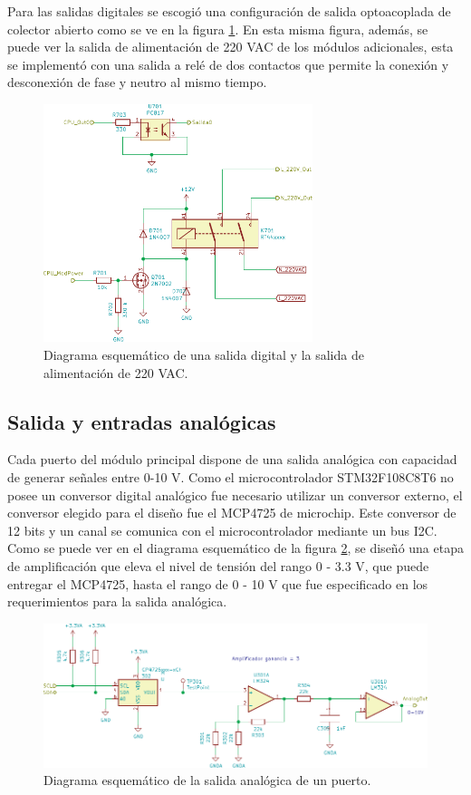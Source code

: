 Para las salidas digitales se escogió una configuración de salida optoacoplada de colector abierto como se ve en la figura \ref{fig:SalidaDigital}. En esta misma figura, además, se puede ver la salida de alimentación de 220 VAC de los módulos adicionales, esta se implementó con una salida a relé de dos contactos que permite la conexión y desconexión de fase y neutro al mismo tiempo.

\begin{figure}[H]
	\centering
	\includegraphics[width=0.7\textwidth]{./Figures/SalidaDigital.pdf}
	\caption{Diagrama esquemático de una salida digital y la salida de alimentación de 220 VAC.}
	\label{fig:SalidaDigital}
\end{figure}

\subsection{Salida y entradas analógicas}

Cada puerto del módulo principal dispone de una salida analógica con capacidad de generar señales entre 0-10 V. Como el microcontrolador STM32F108C8T6 no posee un conversor digital analógico fue necesario utilizar un conversor externo, el conversor elegido para el diseño fue el MCP4725 de microchip. Este conversor de 12 bits y un canal se comunica con el microcontrolador mediante un bus I2C. 
Como se puede ver en el diagrama esquemático de la figura \ref{fig:SalidaAnalogica}, se diseñó una etapa de amplificación que eleva el nivel de tensión del rango 0 - 3.3 V, que puede entregar el MCP4725, hasta el rango de 0 - 10 V que fue especificado en los requerimientos para la salida analógica.

\begin{figure}[H]
	\centering
	\includegraphics[width=1\textwidth]{./Figures/SalidaAnalogica.pdf}
	\caption{Diagrama esquemático de la salida analógica de un puerto.}
	\label{fig:SalidaAnalogica}
\end{figure}

